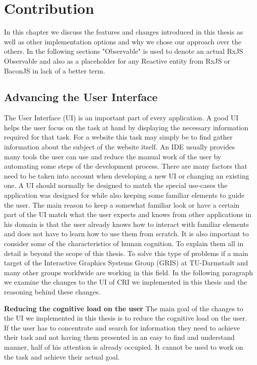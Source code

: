 \chapter{Contribution}
In this chapter we discuss the features and changes introduced in this thesis as well as other implementation options and why we chose our approach over the others.
In the following sections "Observable" is used to denote an actual RxJS Observable and also as a placeholder for any Reactive entity from RxJS or BaconJS in lack of a better term.

\section{Advancing the User Interface}
The User Interface (UI) is an important part of every application. A good UI helps the user focus on the task at hand by displaying the necessary information required for that task. For a website this task may simply be to find gather information about the subject of the website itself. An IDE usually provides many tools the user can use and reduce the manual work of the user by automating some steps of the development process. There are many factors that need to be taken into account when developing a new UI or changing an existing one. A UI should normally be designed to match the special use-cases the application was designed for while also keeping some familiar elements to guide the user. The main reason to keep a somewhat familiar look or have a certain part of the UI match what the user expects and knows from other applications in his domain is that the user already knows how to interact with familiar elements and does not have to learn how to use them from scratch. It is also important to consider some of the characteristics of human cognition. To explain them all in detail is beyond the scope of this thesis. To solve this type of problems if a main target of the Interactive Graphics Systems Group (GRIS) at TU-Darmstadt and many other groups worldwide are working in this field. In the following paragraph we examine the changes to the UI of CRI we implemented in this thesis and the reasoning behind these changes.
  
\textbf{Reducing the cognitive load on the user}
The main goal of the changes to the UI we implemented in this thesis is to reduce the cognitive load on the user. If the user has to concentrate and search for information they need to achieve their task and not having them presented in an easy to find and understand manner, half of his attention is already occupied. It cannot be used to work on the task and achieve their actual goal.

